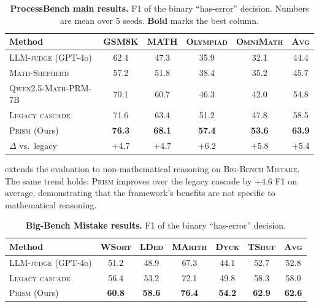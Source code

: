 \documentclass[11pt,a4paper]{article}
\theoremstyle{plain}
\theoremstyle{definition}
\theoremstyle{remark}
\begin{document}
\begin{table}[t]
\centering
\caption{\textbf{ProcessBench main results.} F1 of the binary
``has-error'' decision. Numbers are mean over $5$ seeds.
\textbf{Bold} marks the best column.}
\label{tab:main}
\small
\begin{tabular}{lccccc}
\toprule
Method & \textsc{GSM8K} & \textsc{MATH} & \textsc{Olympiad} &
  \textsc{OmniMath} & \textsc{Avg} \\
\midrule
\textsc{LLM-judge} (GPT-4o) & 62.4 & 47.3 & 35.9 & 32.1 & 44.4 \\
\textsc{Math-Shepherd}~\citep{wang2024mathshepherd} & 57.2 & 51.8 & 38.4 & 35.2 & 45.7 \\
\textsc{Qwen2.5-Math-PRM-7B}~\citep{zheng2024processbench} & 70.1 & 60.7 & 46.3 & 42.0 & 54.8 \\
\textsc{Legacy cascade} & 71.6 & 63.4 & 51.2 & 47.8 & 58.5 \\
\midrule
\textsc{Prism} (Ours) & \textbf{76.3} & \textbf{68.1} &
  \textbf{57.4} & \textbf{53.6} & \textbf{63.9} \\
\quad $\Delta$ vs.\ legacy & {\small +4.7} & {\small +4.7} &
  {\small +6.2} & {\small +5.8} & {\small +5.4} \\
\bottomrule
\end{tabular}
\end{table}

 extends the evaluation to non-mathematical reasoning
on \textsc{Big-Bench Mistake}. The same trend holds: \textsc{Prism}
improves over the legacy cascade by $\mathbf{+4.6}$ F1 on average,
demonstrating that the framework's benefits are not specific to
mathematical reasoning.

\begin{table}[t]
\centering
\caption{\textbf{Big-Bench Mistake results.} F1 of the binary
``has-error'' decision.}
\label{tab:bbm}
\small
\begin{tabular}{lcccccc}
\toprule
Method & \textsc{WSort} & \textsc{LDed} & \textsc{MArith} &
  \textsc{Dyck} & \textsc{TShuf} & \textsc{Avg} \\
\midrule
\textsc{LLM-judge} (GPT-4o)   & 51.2 & 48.9 & 67.3 & 44.1 & 52.7 & 52.8 \\
\textsc{Legacy cascade}       & 56.4 & 53.2 & 72.1 & 49.8 & 58.3 & 58.0 \\
\textsc{Prism} (Ours) & \textbf{60.8} & \textbf{58.6} &
  \textbf{76.4} & \textbf{54.2} & \textbf{62.9} & \textbf{62.6} \\
\bottomrule
\end{tabular}
\end{table}
\end{document}

